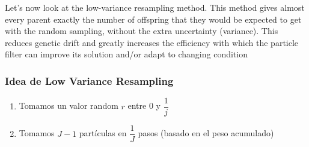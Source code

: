 \begin{frame}
\begin{itemize}
{            Let’s now look at the low-variance resampling method. This method gives almost every parent exactly the number of offspring that they would be expected to get with the random sampling, without the extra uncertainty (variance). This reduces genetic drift and greatly increases the efficiency with which the particle filter can improve its solution and/or adapt to changing condition
        }

    \end{itemize}
\end{frame}


\begin{frame}
    \frametitle{Idea de Low Variance Resampling}

    \begin{center}
    \end{center}

    \begin{enumerate}
        \item<1-> Tomamos un valor random $r$ entre 0 y $\dfrac{1}{j}$
        \item<2> Tomamos $J-1$  partículas en $\dfrac{1}{J}$ pasos (basado en el peso acumulado)
    \end{enumerate}

\end{frame}

